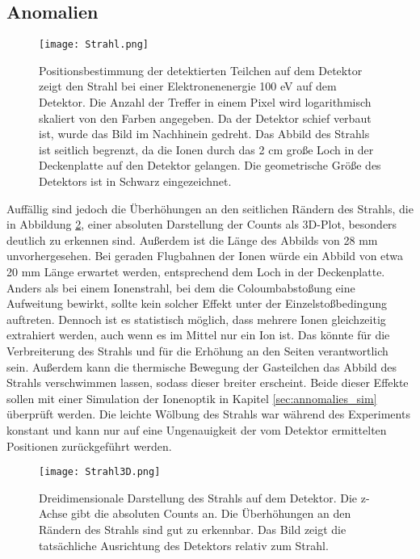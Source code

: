 \subsection{Anomalien}
\label{sec:Anomalien}
\begin{figure}
    \hspace{-1.1cm}\texttt{[image: Strahl.png]}
    \caption[Logarithmisches Abbild des Strahls auf dem Detektor]{Positionsbestimmung der detektierten Teilchen auf dem Detektor zeigt den Strahl bei einer Elektronenenergie 100 eV auf dem Detektor. Die Anzahl der Treffer in einem Pixel wird logarithmisch skaliert von den Farben angegeben. Da der Detektor schief verbaut ist, wurde das Bild im Nachhinein gedreht. Das Abbild des Strahls ist seitlich begrenzt, da die Ionen durch das 2 cm große Loch in der Deckenplatte auf den Detektor gelangen. Die geometrische Größe des Detektors ist in Schwarz eingezeichnet.}
    \label{fig:Strahl} 
\end{figure}
Auffällig sind jedoch die Überhöhungen an den seitlichen Rändern des Strahls, die in Abbildung \ref{fig:Strahl3D}, einer absoluten Darstellung der Counts als 3D-Plot, besonders deutlich zu erkennen sind. Außerdem ist die Länge des Abbilds von 28 mm unvorhergesehen. Bei geraden Flugbahnen der Ionen würde ein Abbild von etwa 20 mm Länge erwartet werden, entsprechend dem Loch in der Deckenplatte. Anders als bei einem Ionenstrahl, bei dem die Coloumbabstoßung eine Aufweitung bewirkt, sollte kein solcher Effekt unter der Einzelstoßbedingung auftreten. Dennoch ist es statistisch möglich, dass mehrere Ionen gleichzeitig extrahiert werden, auch wenn es im Mittel nur ein Ion ist. Das könnte für die Verbreiterung des Strahls und für die Erhöhung an den Seiten verantwortlich sein. Außerdem kann die thermische Bewegung der Gasteilchen das Abbild des Strahls verschwimmen lassen, sodass dieser breiter erscheint. Beide dieser Effekte sollen mit einer Simulation der Ionenoptik in Kapitel \ref{sec:annomalies_sim} überprüft werden. Die leichte Wölbung des Strahls war während des Experiments konstant und kann nur auf eine Ungenauigkeit der vom Detektor ermittelten Positionen zurückgeführt werden. 

\begin{figure}
    \hspace*{-0cm}\texttt{[image: Strahl3D.png]}
    \caption[Dreidimensionale Darstellung des Strahls auf dem Detektor]{Dreidimensionale Darstellung des Strahls auf dem Detektor. Die z-Achse gibt die absoluten Counts an. Die Überhöhungen an den Rändern des Strahls sind gut zu erkennbar. Das Bild zeigt die tatsächliche Ausrichtung des Detektors relativ zum Strahl.}
    \label{fig:Strahl3D} 
\end{figure}

